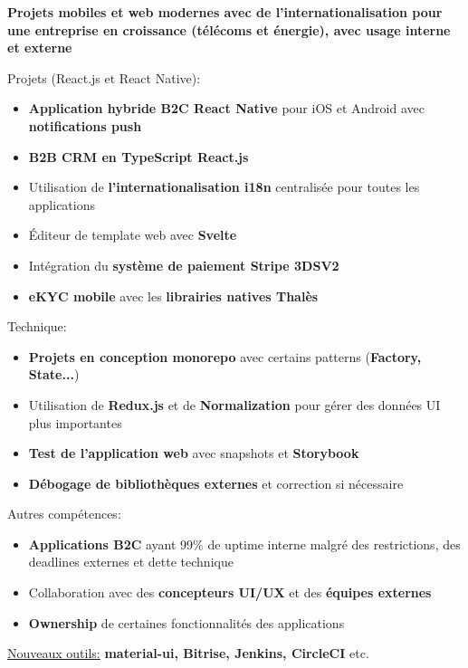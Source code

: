 \documentclass[10pt,a4paper,ragged2e,withhyper]{altacv}
\begin{document}
\divider

\vspace{-.25\baselineskip}
\textbf{\footnotesize{Projets mobiles et web modernes avec de l'internationalisation pour une entreprise en croissance (télécoms et énergie), avec usage interne et externe}}
\smallskip

\vspace{-.5\baselineskip}
\begin{minipage}[t]{0.45\textwidth}
  \vspace{0pt}
  Projets (React.js et React Native):
  \begin{itemize}
    \item \textbf{Application hybride B2C React Native} pour iOS et Android avec \textbf{notifications push}
    \item \textbf{B2B CRM en TypeScript React.js}
    \item Utilisation de \textbf{l'internationalisation i18n} centralisée pour toutes les applications
    \item Éditeur de template web avec \textbf{Svelte}
    \item Intégration du \textbf{système de paiement Stripe 3DSV2}
    \item \textbf{eKYC mobile} avec les \textbf{librairies natives Thalès}
  \end{itemize}
\end{minipage}
\hfill
\begin{minipage}[t]{0.45\textwidth}
  \vspace{0pt}
  Technique:
  \begin{itemize}
    \item \textbf{Projets en conception monorepo} avec certains patterns (\textbf{Factory, State...})
    \item Utilisation de \textbf{Redux.js} et de \textbf{Normalization} pour gérer des données UI plus importantes
    \item \textbf{Test de l'application web} avec snapshots et \textbf{Storybook}
    \item \textbf{Débogage de bibliothèques externes} et correction si nécessaire
  \end{itemize}
\end{minipage}

\bigskip
Autres compétences:
\begin{itemize}
  \item \textbf{Applications B2C} ayant 99\% de uptime interne malgré des restrictions, des deadlines externes et dette technique
  \item Collaboration avec des \textbf{concepteurs UI/UX} et des \textbf{équipes externes}
  \item \textbf{Ownership} de certaines fonctionnalités des applications
\end{itemize}
\begin{itshape}
  \underline{Nouveaux outils:}
  \small{\textbf{material-ui, Bitrise, Jenkins, CircleCI} etc.}
\end{itshape}
\end{document}
